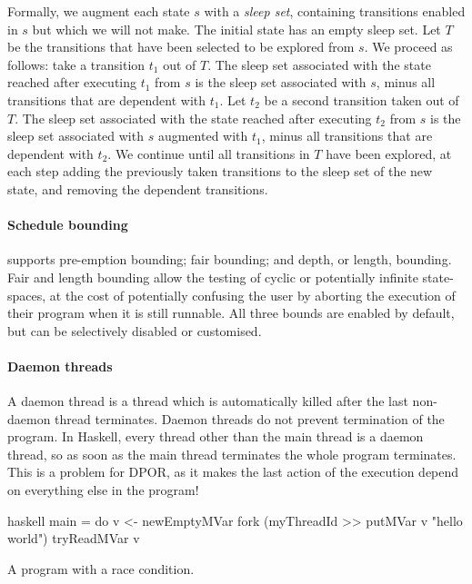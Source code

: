 Formally, we augment each state $s$ with a \emph{sleep set},
containing transitions enabled in $s$ but which we will not make.  The
initial state has an empty sleep set.  Let $T$ be the transitions that
have been selected to be explored from $s$.  We proceed as follows:
take a transition $t_{1}$ out of $T$.  The sleep set associated with
the state reached after executing $t_{1}$ from $s$ is the sleep set
associated with $s$, minus all transitions that are dependent with
$t_{1}$.  Let $t_{2}$ be a second transition taken out of $T$.  The
sleep set associated with the state reached after executing $t_{2}$
from $s$ is the sleep set associated with $s$ augmented with $t_{1}$,
minus all transitions that are dependent with $t_{2}$.  We continue
until all transitions in $T$ have been explored, at each step adding
the previously taken transitions to the sleep set of the new state,
and removing the dependent transitions.

\paragraph{Schedule bounding}
\dejafu{} supports pre-emption bounding\cite{musuvathi2007}; fair
bounding\cite{musuvathi2008}; and depth, or length,
bounding\cite{russell2002}.  Fair and length bounding allow the
testing of cyclic or potentially infinite state-spaces, at the cost of
potentially confusing the user by aborting the execution of their
program when it is still runnable.  All three bounds are enabled by
default, but can be selectively disabled or customised.

\paragraph{Daemon threads}
A daemon thread is a thread which is automatically killed after the
last non-daemon thread terminates.  Daemon threads do not prevent
termination of the program.  In Haskell, every thread other than the
main thread is a daemon thread, so as soon as the main thread
terminates the whole program terminates.  This is a problem for DPOR,
as it makes the last action of the execution depend on everything else
in the program!

\begin{listing}
\centering
\begin{cminted}{haskell}
main = do
  v <- newEmptyMVar
  fork (myThreadId >> putMVar v "hello world")
  tryReadMVar v
\end{cminted}
\caption{A program with a race condition.}\label{lst:daemon1}
\end{listing}

